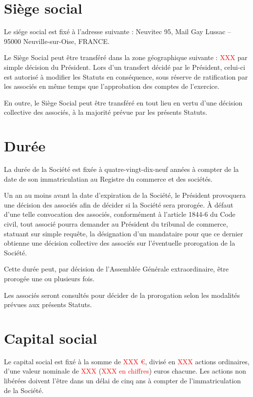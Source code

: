 \documentclass[a4paper,12pt]{report}
\newcommand{\address}{Neuvitec 95, Mail Gay Lussac -- 95000 Neuville-sur-Oise, FRANCE}
\begin{document}
\section{Siège social}
Le siége social est fixé à l'adresse suivante : \address. 

Le Siège Social peut être transféré dans la zone géographique suivante : \textcolor{red}{XXX} par simple décision du Président. Lors d'un transfert décidé par le Président, celui-ci est autorisé à modifier les Statuts en conséquence, sous réserve de ratification par les associés en même temps que l'approbation des comptes de l'exercice.

En outre, le Siège Social peut être transféré en tout lieu en vertu d'une décision collective des associés, à la majorité prévue par les présents Statuts.

\section{Durée}
La durée de la Société est fixée à quatre-vingt-dix-neuf années à compter de la date de son immatriculatian au Registre du commerce et des sociétés.

Un an au moins avant la date d'expiration de la Société, le Président provoquera une décision des associés afin de décider si la Société sera prorogée. 
À défaut d'une telle convocation des associés, conformément à l'article 1844-6 du Code civil, tout associé pourra demander au Président du tribunal de commerce, 
statuant sur simple requête, la désignation d'un mandataire pour que ce dernier obtienne une décision collective des associés sur l'éventuelle prorogation de la Société.

Cette durée peut, par décision de l'Assemblée Générale extraordinaire, être prorogée une ou plusieurs fois.

Les associés seront consultés pour décider de la prorogation selon les modalités prévues aux présents Statuts.

\section{Capital social}
Le capital social est fixé à la somme de \textcolor{red}{XXX €}, divisé en \textcolor{red}{XXX} actions ordinaires,
d'une valeur nominale de \textcolor{red}{XXX} (\textcolor{red}{XXX en chiffres}) euros chacune.
Les actions non libérées doivent l'être dans un délai de cinq ans à compter de l'immatriculation de la Société.
\end{document}
